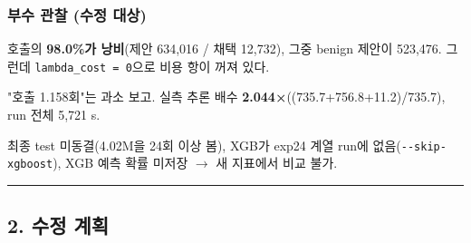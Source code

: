 \subsubsection{부수 관찰 (수정 대상)}
\par\noindent \textbullet\enspace 호출의 \textbf{98.0\%가 낭비}(제안 634,016 /\allowbreak{} 채택 12,732), 그중 benign 제안이 523,476. 그런데 \texttt{lambda\_\allowbreak{}\allowbreak{}c\allowbreak{}ost =\allowbreak{}\allowbreak{} 0}으로 비용 항이 꺼져 있다.


\par\noindent \textbullet\enspace "호출 1.158회"는 과소 보고. 실측 추론 배수 \textbf{2.044×}((735.7+\allowbreak{}756.8+\allowbreak{}11.2)/\allowbreak{}735.7), run 전체 5,721 s.


\par\noindent \textbullet\enspace 최종 test 미동결(4.02M을 24회 이상 봄), XGB가 exp24 계열 run에 없음(\texttt{-\allowbreak{}-\allowbreak{}skip-\allowbreak{}x\allowbreak{}gboost}), XGB 예측 확률 미저장  \ensuremath{\rightarrow}  새 지표에서 비교 불가.



\medskip\hrule\medskip
\subsection{2. 수정 계획}
